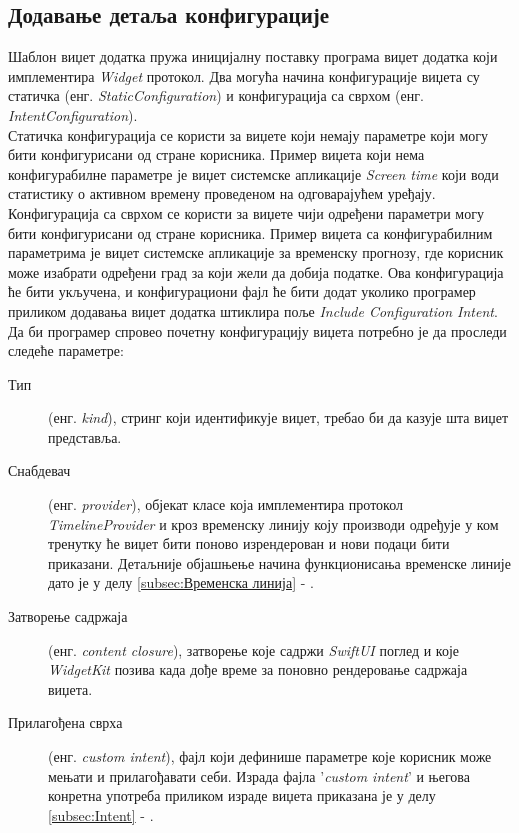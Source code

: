 \documentclass[12pt,oneside]{memoir}
\begin{document}
\subsection{Додавање детаља конфигурације}
\indent Шаблон виџет додатка пружа иницијалну поставку програма виџет додатка који имплементира \textit{Widget} протокол. Два могућа начина конфигурације виџета су статичка (енг. \textit{StaticConfiguration}) и конфигурација са сврхом (енг. \textit{IntentConfiguration}). \\
\indent Статичка конфигурација се користи за виџете који немају параметре који могу бити конфигурисани од стране корисника. Пример виџета који нема конфигурабилне параметре је виџет системске апликације \textit{Screen time} који води статистику о активном времену проведеном на одговарајућем уређају. Конфигурација са сврхом се користи за виџете чији одређени параметри могу бити конфигурисани од стране корисника. Пример виџета са конфигурабилним параметрима је виџет системске апликације за временску прогнозу, где корисник може изабрати одређени град за који жели да добија податке. Ова конфигурација ће бити укључена, и конфигурациони фајл ће бити додат уколико програмер приликом додавања виџет додатка штиклира поље \textit{Include Configuration Intent}.
\\
\indent Да би програмер спровео почетну конфигурацију виџета потребно је да проследи следеће параметре:
\begin{description}
    \item [Тип] (енг. \textit{kind}), стринг који идентификује виџет, требао би да казује шта виџет представља.
    \item [Снабдевач] (енг. \textit{provider}), објекат класе која имплементира протокол \textit{Time\-lineProvider} и кроз временску линију коју производи одређује у ком тренутку ће виџет бити поново изрендерован и нови подаци бити приказани. Детаљније објашњење начина функционисања временске линије дато је у делу \ref{subsec:Временска линија} - .
    \item [Затворење садржаја] (енг. \textit{content closure}), затворење које садржи \textit{SwiftUI} поглед и које \textit{WidgetKit} позива када дође време за поновно рендеровање садржаја виџета.
    \item [Прилагођена сврха] (енг. \textit{custom intent}), фајл који дефинише параметре које корисник може мењати и прилагођавати себи. Израда фајла '\textit{custom intent}' и његова конретна употреба приликом израде виџета приказана је у делу \ref{subsec:Intent} - .
\end{description}
\end{document}
